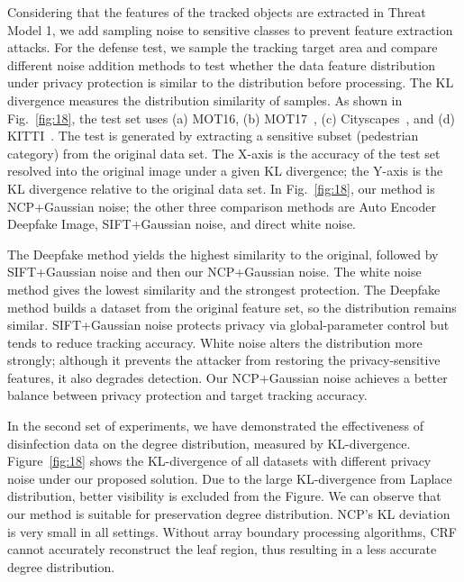 \documentclass[trans]{IEEEtran}
\begin{document}
Considering that the features of the tracked objects are extracted in Threat Model 1, we add sampling noise to sensitive classes to prevent feature extraction attacks. For the defense test, we sample the tracking target area and compare different noise addition methods to test whether the data feature distribution under privacy protection is similar to the distribution before processing. The KL divergence measures the distribution similarity of samples. As shown in Fig.~\ref{fig:18}, the test set uses (a) MOT16, (b) MOT17~\cite{milan2016mot16}, (c) Cityscapes~\cite{cordts2016cityscapes}, and (d) KITTI~\cite{geiger2013vision}. The test is generated by extracting a sensitive subset (pedestrian category) from the original data set. The X-axis is the accuracy of the test set resolved into the original image under a given KL divergence; the Y-axis is the KL divergence relative to the original data set. In Fig.~\ref{fig:18}, our method is NCP+Gaussian noise; the other three comparison methods are Auto Encoder Deepfake Image, SIFT+Gaussian noise, and direct white noise.

The Deepfake method yields the highest similarity to the original, followed by SIFT+Gaussian noise and then our NCP+Gaussian noise. The white noise method gives the lowest similarity and the strongest protection. The Deepfake method builds a dataset from the original feature set, so the distribution remains similar. SIFT+Gaussian noise protects privacy via global-parameter control but tends to reduce tracking accuracy. White noise alters the distribution more strongly; although it prevents the attacker from restoring the privacy-sensitive features, it also degrades detection. Our NCP+Gaussian noise achieves a better balance between privacy protection and target tracking accuracy.

In the second set of experiments, we have demonstrated the effectiveness of disinfection data on the degree distribution, measured by KL-divergence. Figure~\ref{fig:18} shows the KL-divergence of all datasets with different privacy noise under our proposed solution. Due to the large KL-divergence from Laplace distribution, better visibility is excluded from the Figure. We can observe that our method is suitable for preservation degree distribution. NCP's KL deviation is very small in all settings. Without array boundary processing algorithms, CRF cannot accurately reconstruct the leaf region, thus resulting in a less accurate degree distribution.
	
\end{document}
